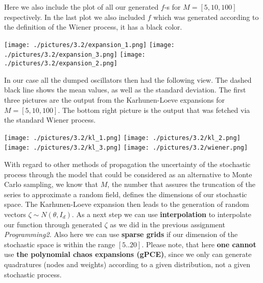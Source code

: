 \documentclass[11pt]{article}
\begin{document}
Here we also include the plot of all our generated $f$-s for $M = [5,10,100]$ respectively. In the last plot we also included $f$ which was generated according to the definition of the Wiener process, it has a black color.

\texttt{[image: ./pictures/3.2/expansion\_1.png]}
\texttt{[image: ./pictures/3.2/expansion\_3.png]}
\texttt{[image: ./pictures/3.2/expansion\_2.png]}

In our case all the dumped oscillators then had the following view. The dashed black line shows the mean values, as well as the standard deviation. The first three pictures are the output from the Karhunen-Loeve expansions for $M = [5, 10, 100]$. The bottom right picture is the output that was fetched via the standard Wiener process.

\texttt{[image: ./pictures/3.2/kl\_1.png]}
\texttt{[image: ./pictures/3.2/kl\_2.png]}\\
\texttt{[image: ./pictures/3.2/kl\_3.png]}
\texttt{[image: ./pictures/3.2/wiener.png]}

With regard to other methods of propagation the uncertainty of the stochastic process through the model that could be considered as an alternative to Monte Carlo sampling, we know that $M$, the number that assures the truncation of the series to approximate a random field, defines the dimensions of our stochastic space. The Karhunen-Loeve expansion then leads to the generation of random vectors $\zeta \sim N(\theta, I_d)$. As a next step we can use \textbf{interpolation} to interpolate our function through generated $\zeta$ as we did in the previous assignment \textit{Programming2.} Also here we can use \textbf{ sparse grids} if our dimension of the stochastic space is within the range $[5 ..20]$. Please note, that here \textbf{one cannot} use \textbf{the polynomial chaos expansions (gPCE)}, since we only can generate quadratures (nodes and weights) according to a given distribution, not a given stochastic process.
\end{document}
